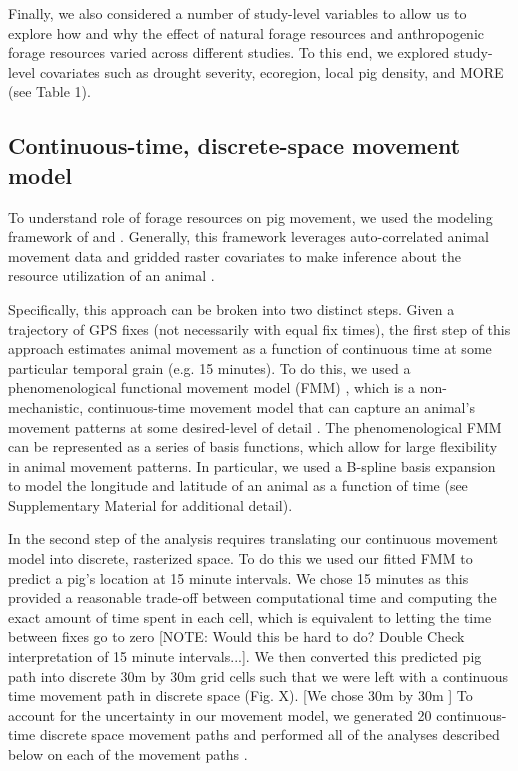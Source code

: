 \documentclass[a4paper]{article}
\begin{document}
Finally, we also considered a number of study-level variables to allow us to explore how and why the effect of natural forage resources and anthropogenic forage resources varied across different studies. To this end, we explored study-level covariates such as drought severity, ecoregion, local pig density, and MORE (see Table 1). 

\subsection*{Continuous-time, discrete-space movement model}

To understand role of forage resources on pig movement, we used the modeling framework of \cite{Hanks2015} and \cite{Wilson2018}.  Generally, this framework leverages auto-correlated animal movement data and gridded raster covariates to make inference about the resource utilization of an animal \citep{Hanks2015,Buderman2018,Wilson2018}.  

Specifically, this approach can be broken into two distinct steps. Given a trajectory of GPS fixes (not necessarily with equal fix times), the first step of this approach estimates animal movement as a function of continuous time at some particular temporal grain (e.g. 15 minutes).  To do this, we used a phenomenological functional movement model (FMM) \citep{Buderman2016,Hooten2017a}, which is a non-mechanistic, continuous-time movement model that can capture an animal's movement patterns at some desired-level of detail \citep{Buderman2016}.  The phenomenological FMM can be represented as a series of basis functions, which allow for large flexibility in animal movement patterns.
In particular, we used a B-spline basis expansion to model the longitude and latitude of an animal as a function of time (see Supplementary Material for additional detail).

In the second step of the analysis requires translating our continuous movement model into discrete, rasterized space.  To do this we used our fitted FMM to predict a pig's location at 15 minute intervals. We chose 15 minutes as this provided a reasonable trade-off between computational time and computing the exact amount of time spent in each cell, which is equivalent to letting the time between fixes go to zero [NOTE: Would this be hard to do? Double Check interpretation of 15 minute intervals...]. We then converted this predicted pig path into discrete 30m by 30m grid cells such that we were left with a continuous time movement path in discrete space (Fig. X). [We chose 30m by 30m ]
To account for the uncertainty in our movement model, we generated 20 continuous-time discrete space movement paths and performed all of the analyses described below on each of the movement paths \citep{Hanks2015,Buderman2018}.
\end{document}
